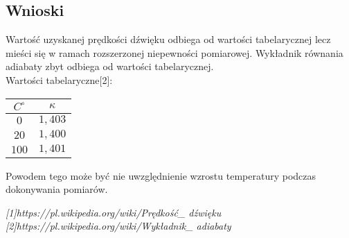 \documentclass{article}
\begin{document}
\subsection{Wnioski}
Wartość uzyskanej prędkości dźwięku odbiega od wartości tabelarycznej  lecz mieści się w ramach rozszerzonej niepewności pomiarowej. Wykładnik równania adiabaty zbyt odbiega od wartości tabelarycznej.\\
Wartości tabelaryczne[2]:
\begin{center}
    \begin{tabular}{|c|c|}
    \hline
    $C^{\circ}$ & $\kappa $ \\ \hline
    $0$ & $1,403$\\ \hline
    $20$ & $1,400$\\ \hline
    $100$ & $1,401$\\ \hline    
    \end{tabular}
\end{center}
Powodem tego może być nie uwzględnienie wzrostu temperatury podczas dokonywania pomiarów.\\
\begin{flushright}
\begin{scriptsize}
\textit{[1]https://pl.wikipedia.org/wiki/Prędkość\_ dźwięku} \\
\textit{[2]https://pl.wikipedia.org/wiki/Wykładnik\_ adiabaty}\\
\end{scriptsize}
\end{flushright}
\end{document}
